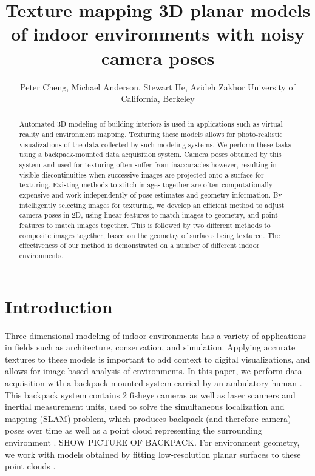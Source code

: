 \documentclass[]{spie}  %
\title{Texture mapping 3D planar models of indoor environments with noisy camera poses}
\author{Peter Cheng, Michael Anderson, Stewart He, Avideh Zakhor
\skiplinehalf
University of California, Berkeley\\
}
\begin{document}
\maketitle

\begin{abstract}
  Automated 3D modeling of building interiors is used in applications
  such as virtual reality and environment mapping. Texturing these
  models allows for photo-realistic visualizations of the data
  collected by such modeling systems. We perform these tasks using a
  backpack-mounted data acquisition system. Camera poses obtained by
  this system and used for texturing often suffer from inaccuracies
  however, resulting in visible discontinuities when successive images
  are projected onto a surface for texturing. Existing methods to
  stitch images together are often computationally expensive and work
  independently of pose estimates and geometry information. By
  intelligently selecting images for texturing, we develop an
  efficient method to adjust camera poses in 2D, using linear features
  to match images to geometry, and point features to match images
  together. This is followed by two different methods to composite
  images together, based on the geometry of surfaces being
  textured. The effectiveness of our method is demonstrated on a
  number of different indoor environments.
\end{abstract}



\section{Introduction}
\label{sec:introduction} %
Three-dimensional modeling of indoor environments has a variety of
applications in fields such as architecture, conservation, and
simulation. Applying accurate textures to these models is important to
add context to digital visualizations, and allows for image-based
analysis of environments. In this paper, we perform data acquisition
with a backpack-mounted system carried by an ambulatory human
\cite{liu2010indoor}. This backpack system contains 2 fisheye cameras
as well as laser scanners and inertial measurement units,
used to solve the simultaneous localization and mapping (SLAM)
problem, which produces backpack (and therefore camera) poses over
time as well as a point cloud representing the surrounding environment
\cite{chen2010indoor, liu2010indoor, kua2012loopclosure}. SHOW PICTURE OF BACKPACK. For
environment geometry, we work with models obtained by fitting
low-resolution planar surfaces to these point clouds
\cite{sanchez2012point}.
\end{document}
